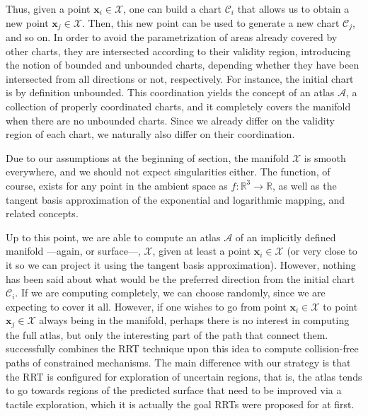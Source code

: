 Thus, given a point $\mathbf{x}_i \in \mathcal{X}$, one can build a chart $\mathcal{C}_i$ that allows us to obtain a new point $\mathbf{x}_j \in \mathcal{X}$. Then, this new point can be used to generate a new chart $\mathcal{C}_j$, and so on. In order to avoid the parametrization of areas already covered by other charts, they are intersected according to their validity region, introducing the notion of bounded and unbounded charts, depending whether they have been intersected from all directions or not, respectively. For instance, the initial chart is by definition unbounded. This coordination yields the concept of an atlas $\mathcal{A}$, a collection of properly coordinated charts, and it completely covers the manifold when there are no unbounded charts. Since we already differ on the validity region of each chart, we naturally also differ on their coordination.

Due to our assumptions at the beginning of section, the manifold $\mathcal{X}$ is smooth everywhere, and we should not expect singularities either. The function, of course, exists for any point in the ambient space as $f:\mathbb{R}^3 \rightarrow \mathbb{R}$, as well as the tangent basis approximation of the exponential and logarithmic mapping, and related concepts. 

Up to this point, we are able to compute an atlas $\mathcal{A}$ of an implicitly defined manifold ---again, or surface---, $\mathcal{X}$, given at least a point $\mathbf{x}_i \in \mathcal{X}$ (or very close to it so we can project it using the tangent basis approximation). However, nothing has been said about what would be the preferred direction from the initial chart $\mathcal{C}_i$. If we are computing completely, we can choose randomly, since we are expecting to cover it all. However, if one wishes to go from point $\mathbf{x}_i \in \mathcal{X}$ to point $\mathbf{x}_j \in \mathcal{X}$ always being in the manifold, perhaps there is no interest in computing the full atlas, but only the interesting part of the path that connect them. \citet{Jaillet2013Path} successfully combines the RRT technique upon this idea to compute collision-free paths of constrained mechanisms. The main difference with our strategy is that the RRT is configured for exploration of uncertain regions, that is, the atlas tends to go towards regions of the predicted surface that need to be improved via a tactile exploration, which it is actually the goal RRTs were proposed for at first.


